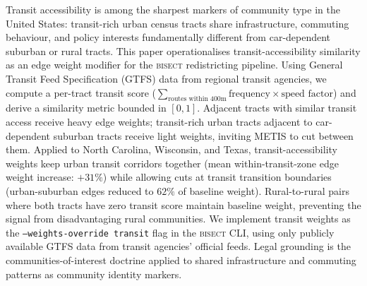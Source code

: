 Transit accessibility is among the sharpest markers of community type in the United States: transit-rich urban census tracts share infrastructure, commuting behaviour, and policy interests fundamentally different from car-dependent suburban or rural tracts. This paper operationalises transit-accessibility similarity as an edge weight modifier for the \textsc{bisect} redistricting pipeline. Using General Transit Feed Specification (GTFS) data from regional transit agencies, we compute a per-tract transit score ($\sum_{\text{routes within 400m}} \text{frequency} \times \text{speed factor}$) and derive a similarity metric bounded in $[0,1]$. Adjacent tracts with similar transit access receive heavy edge weights; transit-rich urban tracts adjacent to car-dependent suburban tracts receive light weights, inviting METIS to cut between them. Applied to North Carolina, Wisconsin, and Texas, transit-accessibility weights keep urban transit corridors together (mean within-transit-zone edge weight increase: $+31\%$) while allowing cuts at transit transition boundaries (urban-suburban edges reduced to $62\%$ of baseline weight). Rural-to-rural pairs where both tracts have zero transit score maintain baseline weight, preventing the signal from disadvantaging rural communities. We implement transit weights as the \texttt{--weights-override transit} flag in the \textsc{bisect} CLI, using only publicly available GTFS data from transit agencies' official feeds. Legal grounding is the communities-of-interest doctrine applied to shared infrastructure and commuting patterns as community identity markers.
